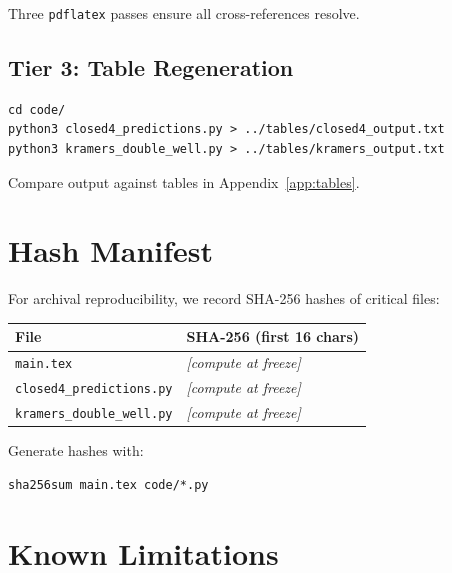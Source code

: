 Three \texttt{pdflatex} passes ensure all cross-references resolve.

\subsection{Tier 3: Table Regeneration}

\begin{verbatim}
cd code/
python3 closed4_predictions.py > ../tables/closed4_output.txt
python3 kramers_double_well.py > ../tables/kramers_output.txt
\end{verbatim}

Compare output against tables in Appendix~\ref{app:tables}.

\section{Hash Manifest}
\label{sec:repro:hash}

For archival reproducibility, we record SHA-256 hashes of critical files:

\begin{center}
\begin{tabular}{ll}
    \toprule
    File & SHA-256 (first 16 chars) \\
    \midrule
    \texttt{main.tex} & \textit{[compute at freeze]} \\
    \texttt{closed4\_predictions.py} & \textit{[compute at freeze]} \\
    \texttt{kramers\_double\_well.py} & \textit{[compute at freeze]} \\
    \bottomrule
\end{tabular}
\end{center}

Generate hashes with:
\begin{verbatim}
sha256sum main.tex code/*.py
\end{verbatim}

\section{Known Limitations}
\label{sec:repro:limitations}

